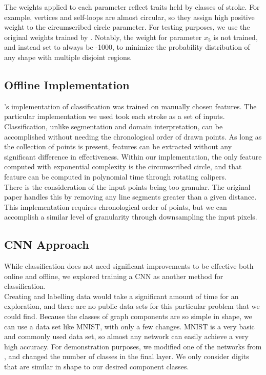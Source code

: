 The weights applied to each parameter reflect traits held by classes of stroke. For example, vertices and self-loops are almost circular, so they assign high positive weight to the circumscribed circle parameter. For testing purposes, we use the original weights trained by \citeauthor{daly2015hand} \cite{daly2015hand}. Notably, the weight for parameter $x_5$ is not trained, and instead set to always be -1000, to minimize the probability distribution of any shape with multiple disjoint regions.

\subsection{Offline Implementation}

\citeauthor{daly2015hand}'s implementation of classification was trained on manually chosen features. The particular implementation we used took each stroke as a set of inputs. Classification, unlike segmentation and domain interpretation, can be accomplished without needing the chronological order of drawn points. As long as the collection of points is present, features can be extracted without any significant difference in effectiveness. Within our implementation, the only feature computed with exponential complexity is the circumscribed circle, and that feature can be computed in polynomial time through rotating calipers. \\

There is the consideration of the input points being too granular. The original paper handles this by removing any line segments greater than a given distance. This implementation requires chronological order of points, but we can accomplish a similar level of granularity through downsampling the input pixels.

\subsection{CNN Approach}
While classification does not need significant improvements to be effective both online and offline, we explored training a CNN as another method for classification. \\

Creating and labelling data would take a significant amount of time for an exploration, and there are no public data sets for this particular problem that we could find. Because the classes of graph components are so simple in shape, we can use a data set like MNIST, with only a few changes. MNIST is a very basic and commonly used data set, so almost any network can easily achieve a very high accuracy. For demonstration purposes, we modified one of the networks from \citeauthor{mnist_network_ref} \cite{mnist_network_ref}, and changed the number of classes in the final layer. We only consider digits that are similar in shape to our desired component classes.\\

